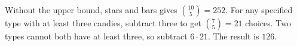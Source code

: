 Without the upper bound, stars and bars gives $\binom{10}5=252$. For any specified type with at least three candies, subtract three to get $\binom75=21$ choices. Two types cannot both have at least three, so subtract $6\cdot21$. The result is $\boxed{126}$.

